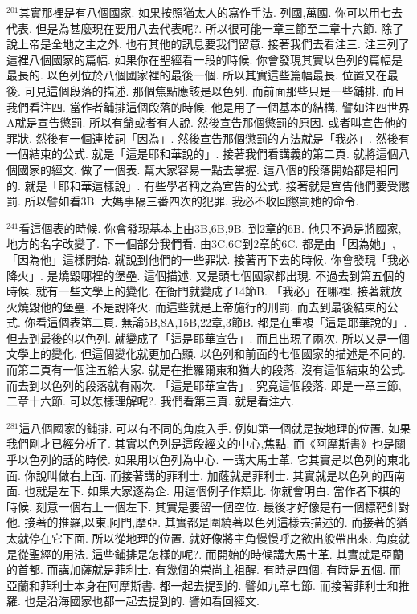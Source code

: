 \documentclass{book}
\begin{document}
$^{201}$其實那裡是有八個國家.
如果按照猶太人的寫作手法.
列國,萬國.
你可以用七去代表.
但是為甚麼現在要用八去代表呢?.
所以很可能一章三節至二章十六節.
除了說上帝是全地之主之外.
也有其他的訊息要我們留意.
接著我們去看注三.
注三列了這裡八個國家的篇幅.
如果你在聖經看一段的時候.
你會發現其實以色列的篇幅是最長的.
以色列位於八個國家裡的最後一個.
所以其實這些篇幅最長.
位置又在最後.
可見這個段落的描述.
那個焦點應該是以色列.
而前面那些只是一些鋪排.
而且我們看注四.
當作者鋪排這個段落的時候.
他是用了一個基本的結構.
譬如注四世界A就是宣告懲罰.
所以有爺或者有人說.
然後宣告那個懲罰的原因.
或者叫宣告他的罪狀.
然後有一個連接詞「因為」.
然後宣告那個懲罰的方法就是「我必」.
然後有一個結束的公式.
就是「這是耶和華說的」.
接著我們看講義的第二頁.
就將這個八個國家的經文.
做了一個表.
幫大家容易一點去掌握.
這八個的段落開始都是相同的.
就是「耶和華這樣說」.
有些學者稱之為宣告的公式.
接著就是宣告他們要受懲罰.
所以譬如看3B.
大媽事隔三番四次的犯罪.
我必不收回懲罰她的命令.

$^{241}$看這個表的時候.
你會發現基本上由3B,6B,9B.
到2章的6B.
他只不過是將國家,地方的名字改變了.
下一個部分我們看.
由3C,6C到2章的6C.
都是由「因為她」,「因為他」這樣開始.
就說到他們的一些罪狀.
接著再下去的時候.
你會發現「我必降火」.
是燒毀哪裡的堡壘.
這個描述.
又是頭七個國家都出現.
不過去到第五個的時候.
就有一些文學上的變化.
在衙門就變成了14節B.
「我必」在哪裡.
接著就放火燒毀他的堡壘.
不是說降火.
而這些就是上帝施行的刑罰.
而去到最後結束的公式.
你看這個表第二頁.
無論5B,8A,15B,22章,3節B.
都是在重複「這是耶華說的」.
但去到最後的以色列.
就變成了「這是耶華宣告」.
而且出現了兩次.
所以又是一個文學上的變化.
但這個變化就更加凸顯.
以色列和前面的七個國家的描述是不同的.
而第二頁有一個注五給大家.
就是在推羅爾東和猶大的段落.
沒有這個結束的公式.
而去到以色列的段落就有兩次.
「這是耶華宣告」.
究竟這個段落.
即是一章三節,二章十六節.
可以怎樣理解呢?.
我們看第三頁.
就是看注六.

$^{281}$這八個國家的鋪排.
可以有不同的角度入手.
例如第一個就是按地理的位置.
如果我們剛才已經分析了.
其實以色列是這段經文的中心,焦點.
而《阿摩斯書》也是關乎以色列的話的時候.
如果用以色列為中心.
一講大馬士革.
它其實是以色列的東北面.
你說叫做右上面.
而接著講的菲利士.
加薩就是菲利士.
其實就是以色列的西南面.
也就是左下.
如果大家逐為企.
用這個例子作類比.
你就會明白.
當作者下棋的時候.
刻意一個右上一個左下.
其實是要留一個空位.
最後才好像是有一個標靶針對他.
接著的推羅,以東,阿門,摩亞.
其實都是圍繞著以色列這樣去描述的.
而接著的猶太就停在它下面.
所以從地理的位置.
就好像將主角慢慢呼之欲出般帶出來.
角度就是從聖經的用法.
這些鋪排是怎樣的呢?.
而開始的時候講大馬士革.
其實就是亞蘭的首都.
而講加薩就是菲利士.
有幾個的崇尚主祖醒.
有時是四個.
有時是五個.
而亞蘭和菲利士本身在阿摩斯書.
都一起去提到的.
譬如九章七節.
而接著菲利士和推羅.
也是沿海國家也都一起去提到的.
譬如看回經文.
\end{document}
